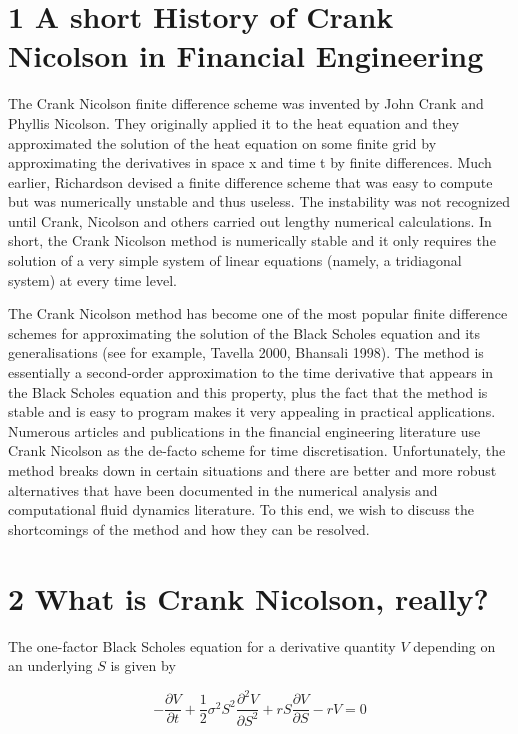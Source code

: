 \documentclass[10pt]{article}
\begin{document}
\section*{1 A short History of Crank Nicolson in Financial Engineering}
The Crank Nicolson finite difference scheme was invented by John Crank and Phyllis Nicolson. They originally applied it to the heat equation and they approximated the solution of the heat equation on some finite grid by approximating the derivatives in space x and time t by finite differences. Much earlier, Richardson devised a finite difference scheme that was easy to compute but was numerically unstable and thus useless. The instability was not recognized until Crank, Nicolson and others carried out lengthy numerical calculations. In short, the Crank Nicolson method is numerically stable and it only requires the\\
solution of a very simple system of linear equations (namely, a tridiagonal system) at every time level.

The Crank Nicolson method has become one of the most popular finite difference schemes for approximating the solution of the Black Scholes equation and its generalisations (see for example, Tavella 2000, Bhansali 1998). The method is essentially a second-order approximation to the time derivative that appears in the Black Scholes equation and this property, plus the fact that the method is stable and is easy to program makes it very appealing in practical applications. Numerous articles and publications in the financial engineering literature use Crank Nicolson as the de-facto scheme for time discretisation. Unfortunately, the method breaks down in certain situations and there are better and more robust alternatives that have been documented in the numerical analysis and computational fluid dynamics literature. To this end, we wish to discuss the shortcomings of the method and how they can be resolved.

\section*{2 What is Crank Nicolson, really?}
The one-factor Black Scholes equation for a derivative quantity $V$ depending on an underlying $S$ is given by


\begin{equation*}
-\frac{\partial V}{\partial t}+\frac{1}{2} \sigma^{2} S^{2} \frac{\partial^{2} V}{\partial S^{2}}+r S \frac{\partial V}{\partial S}-r V=0 \tag{1}
\end{equation*}
\end{document}
